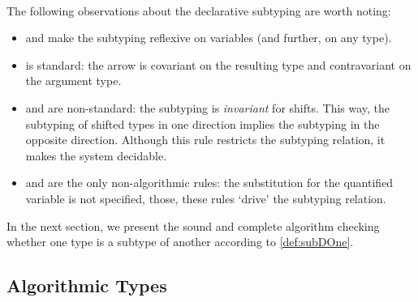 \begin{definition}
  \label{def:subDOne}
  \hfill\\
  \begin{minipage}[t]{0.45\textwidth}
      \ottdefnDOneNsubLabeled[\apppref]{}
  \end{minipage}
  \hfill
  \begin{minipage}[t]{0.48\textwidth}
      \ottdefnDOnePsupLabeled[\apppref]{}
  \end{minipage}

  \begin{minipage}[t]{0.45\textwidth}
      \ottdefnDOneNeqLabeled[\apppref]{}
  \end{minipage}
  \hfill
  \begin{minipage}[t]{0.45\textwidth}
      \ottdefnDOnePeqLabeled[\apppref]{}
  \end{minipage}
\end{definition}

The following observations about the declarative subtyping are worth noting:
\begin{itemize}
  \item {} and 
    make the subtyping reflexive on variables (and further, on any type).
  \item {} is standard: the arrow is covariant on the
    resulting type and contravariant on the argument type.
  \item {}  and  are non-standard:
    the subtyping is \emph{invariant} for shifts. 
    This way, the subtyping of shifted types in one direction implies the subtyping
    in the opposite direction.
    Although this rule restricts the
    subtyping relation, it makes the system decidable.
  \item {} and  are the only
    non-algorithmic rules: the substitution for the quantified variable is
    not specified, those, these rules `drive' the subtyping relation.
\end{itemize}

In the next section, we present the sound and complete algorithm
checking whether one type is a subtype of another according to \cref{def:subDOne}. 

\subsection{Algorithmic Types}

